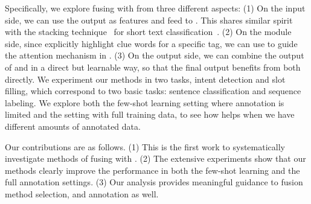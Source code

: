 

Specifically, we explore fusing \RE with \NN from three different aspects: (1) On the \NN input side, we can use the \RE output as features and feed
to \NN. This shares similar spirit with the stacking technique~\cite{wolpert1992stacked} for short text classification~\cite{wang2017combining}.
(2) On the \NN module side, since \REs explicitly highlight clue words for a
specific tag, we can use \RE to guide the attention mechanism in \NN. (3) On the \NN output side, we can combine the output of \RE and \NN in
a direct but learnable way, so that the final output benefits from both directly. %
%
We experiment our methods in two  tasks, intent detection
and slot filling, which correspond to two basic \NLP tasks: sentence classification and sequence labeling.
%
We explore both the few-shot learning setting where annotation is limited and the setting with full training data,
to see how \RE helps when we have different amounts of annotated data.

Our contributions are as follows. (1) This is the first work to systematically investigate methods of fusing \RE with \NN. (2) The
extensive experiments show that our methods clearly improve the \NN performance in both the few-shot learning and the
full annotation settings. (3) Our analysis provides meaningful guidance to fusion method selection, and \RE annotation as well.
